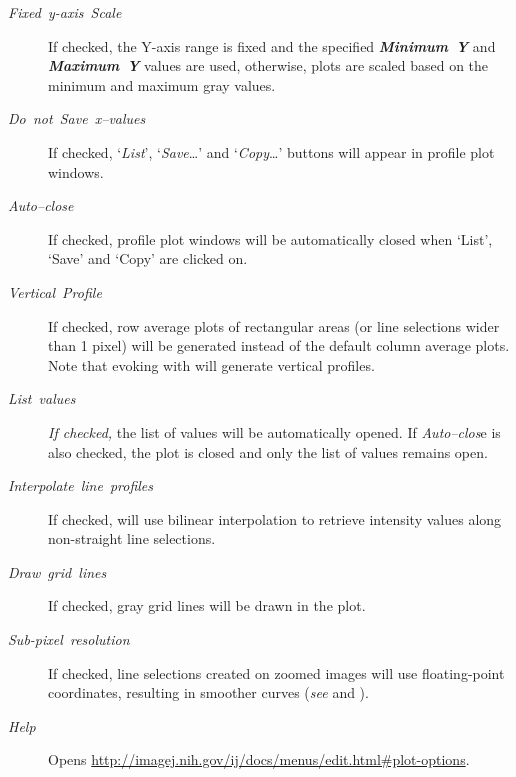 \begin{minipage}[c][1\totalheight][t]{0.665\columnwidth}%
\begin{description}
\item [{\emph{Fixed\ y-axis\ Scale}}] If checked, the Y-axis range is
fixed and the specified \textbf{\emph{Minimum}}\textbf{\ }\textbf{\emph{Y}}
and \textbf{\emph{Maximum}}\textbf{\ }\textbf{\emph{Y}} values are
used, otherwise, plots are scaled based on the minimum and maximum
gray values. 
\item [{\emph{Do\ not\ Save\ x--values}}] If checked, `\emph{List}',
`\emph{Save}\ldots{}' and `\emph{Copy}\ldots{}' buttons will
appear in profile plot windows.
\item [{\emph{Auto--close}}] If checked, profile plot windows will be automatically
closed when `List', `Save' and `Copy' are clicked on.
\item [{\emph{Vertical}\ \emph{Profile}}] If checked, row average plots
of rectangular areas (or line selections wider than 1 pixel) will
be generated instead of the default column average plots. Note that
evoking  with 
 will generate vertical profiles. \end{description}
%
\end{minipage}
\begin{description}
\item [{\emph{List\ values}}] \emph{If checked,} the list of values will
be automatically opened. If \emph{Auto--clos}e is also checked, the
plot is closed and only the list of values remains open.
\item [{\emph{Interpolate}\ \emph{line}\ \emph{profiles}}] If checked,
will use bilinear interpolation
to retrieve intensity values along non-straight line selections.
\item [{\emph{Draw\ grid\ lines}}] If checked, gray grid lines will be
drawn in the plot.
\item [{\emph{Sub-pixel\ resolution}}] \feature{}If checked, line selections
created on zoomed images will use floating-point
coordinates, resulting in smoother curves (\emph{see} 
and ).
\item [{\emph{Help}}] Opens \href{http://imagej.nih.gov/ij/docs/menus/edit.html\#plot-options}{http://imagej.nih.gov/ij/docs/menus/edit.html\#{}plot-options}.
\end{description}

